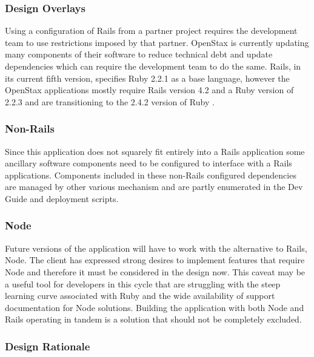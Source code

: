\documentclass[onecolumn, draftclsnofoot,10pt, compsoc]{IEEEtran}
\begin{document}
\subsubsection{Design Overlays}
Using a configuration of Rails from a partner project requires the development team to use restrictions imposed by that partner. OpenStax is currently updating many components of their software to reduce technical debt and update dependencies which can require the development team to do the same. Rails, in its current fifth version, specifies Ruby 2.2.1 as a base language, however the OpenStax applications mostly require Rails version 4.2 and a Ruby version of 2.2.3 and are transitioning to the 2.4.2 version of Ruby \cite{rails-version}.

\subsubsection*{Non-Rails}
Since this application does not squarely fit entirely into a Rails application some ancillary software components need to be configured to interface with a Rails applications. Components included in these non-Rails configured dependencies are managed by other various mechanism and are partly enumerated in the Dev Guide and deployment scripts. 

\subsubsection*{Node}
Future versions of the application will have to work with the alternative to Rails, Node. The client has expressed strong desires to implement features that require Node and therefore it must be considered in the design now. This caveat may be a useful tool for developers in this cycle that are struggling with the steep learning curve associated with Ruby and the wide availability of support documentation for Node solutions. Building the application with both Node and Rails operating in tandem is a solution that should not be completely excluded. 

\subsubsection{Design Rationale}
\end{document}
